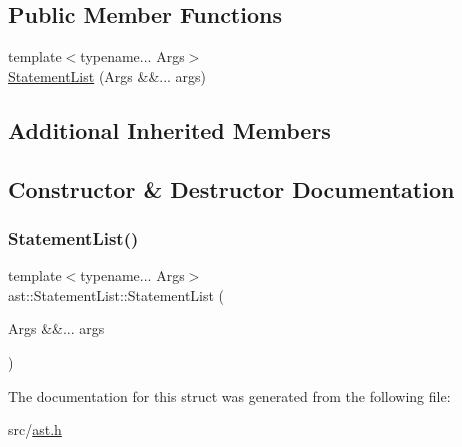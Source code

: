 \subsection*{Public Member Functions}
\begin{DoxyCompactItemize}
\item 
{\footnotesize template$<$typename... Args$>$ }\\\hyperlink{structast_1_1_statement_list_ab8bd7bd01c95b8e98d53a6f082f77d2e}{Statement\+List} (Args \&\&... args)
\end{DoxyCompactItemize}
\subsection*{Additional Inherited Members}


\subsection{Constructor \& Destructor Documentation}
\mbox{\label{structast_1_1_statement_list_ab8bd7bd01c95b8e98d53a6f082f77d2e}} 
\subsubsection{\texorpdfstring{Statement\+List()}{StatementList()}}
{\footnotesize\ttfamily template$<$typename... Args$>$ \\
ast\+::\+Statement\+List\+::\+Statement\+List (\begin{DoxyParamCaption}\item[{Args \&\&...}]{args }\end{DoxyParamCaption})\hspace{0.3cm}{\ttfamily [inline]}}



The documentation for this struct was generated from the following file\+:\begin{DoxyCompactItemize}
\item 
src/\hyperlink{ast_8h}{ast.\+h}\end{DoxyCompactItemize}
